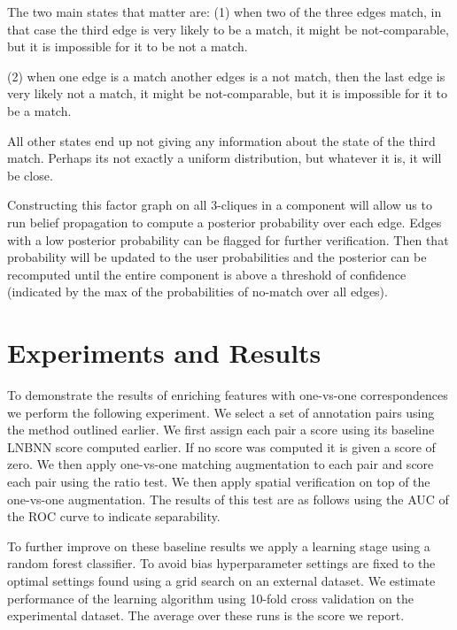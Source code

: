 The two main states that matter are:
(1) when two of the three edges match, in that case the third edge is very
likely to be a match, it might be not-comparable, but it is impossible for it
to be not a match.

(2) when one edge is a match another edges is a not match, then the last edge
is very likely not a match, it might be not-comparable, but it is impossible
for it to be a match.

All other states end up not giving any information about the state of the third
match.  Perhaps its not exactly a uniform distribution, but whatever it is, it
will be close.


Constructing this factor graph on all 3-cliques in a component will allow us to
run belief propagation to compute a posterior probability over each edge.
Edges with a low posterior probability can be flagged for further verification. 
Then that probability will be updated to the user probabilities and the
posterior can be recomputed until the entire component is above a threshold of
confidence (indicated by the max of the probabilities of no-match over all
  edges).



\section{Experiments and Results}

To demonstrate the results of enriching features with one-vs-one
  correspondences we perform the following experiment.
We select a set of annotation pairs using the method outlined earlier.
We first assign each pair a score using its baseline LNBNN score computed
  earlier.
If no score was computed it is given a score of zero.
We then apply one-vs-one matching augmentation to each pair and score each
  pair using the ratio test.
We then apply spatial verification on top of the one-vs-one augmentation.
The results of this test are as follows using the AUC of the ROC curve to
  indicate separability.
  
To further improve on these baseline results we apply a learning stage using a
random forest classifier. To avoid bias hyperparameter settings are fixed to
the optimal settings found using a grid search on an external dataset. 
We estimate performance of the learning algorithm using 10-fold cross
validation on the experimental dataset. The average over these runs is the
score we report.


